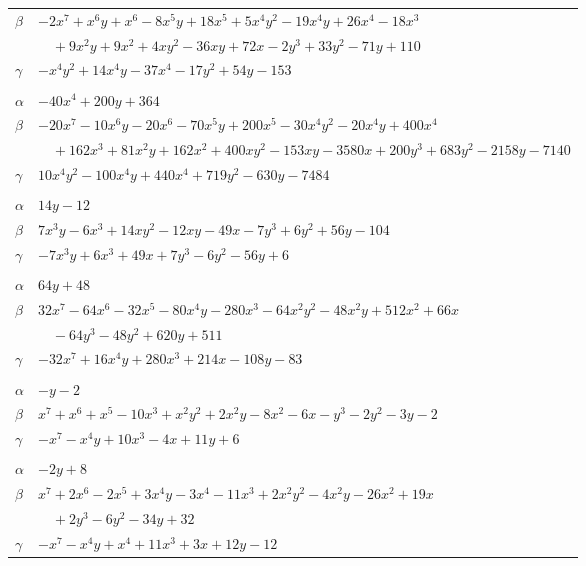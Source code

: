 \documentclass[11pt]{article}
\begin{document}
\begin{longtable}{@{}ll@{}}
$\beta$ & $-2x^{7}+x^{6}y+x^{6}-8x^{5}y+18x^{5}+5x^{4}y^{2}-19x^{4}y+26x^{4}-18x^{3}$\\
 & $\quad +9x^{2}y+9x^{2}+4xy^{2}-36xy+72x-2y^{3}+33y^{2}-71y+110$\\
$\gamma$ & $-x^{4}y^{2}+14x^{4}y-37x^{4}-17y^{2}+54y-153$\\
\addlinespace[3pt]
\multicolumn{2}{@{}l}{$\{i,j\}=\{20,34\}$, $k_{ij}=2^{2}\cdot 3^{4}$}\\
$\alpha$ & $-40x^{4}+200y+364$\\
$\beta$ & $-20x^{7}-10x^{6}y-20x^{6}-70x^{5}y+200x^{5}-30x^{4}y^{2}-20x^{4}y+400x^{4}$\\
 & $\quad +162x^{3}+81x^{2}y+162x^{2}+400xy^{2}-153xy-3580x+200y^{3}+683y^{2}-2158y-7140$\\
$\gamma$ & $10x^{4}y^{2}-100x^{4}y+440x^{4}+719y^{2}-630y-7484$\\
\addlinespace[3pt]
\multicolumn{2}{@{}l}{$\{i,j\}=\{21,32\}$, $k_{ij}=2^{2}\cdot 3$}\\
$\alpha$ & $14y-12$\\
$\beta$ & $7x^{3}y-6x^{3}+14xy^{2}-12xy-49x-7y^{3}+6y^{2}+56y-104$\\
$\gamma$ & $-7x^{3}y+6x^{3}+49x+7y^{3}-6y^{2}-56y+6$\\
\addlinespace[3pt]
\multicolumn{2}{@{}l}{$\{i,j\}=\{21,33\}$, $k_{ij}=5\cdot 7$}\\
$\alpha$ & $64y+48$\\
$\beta$ & $32x^{7}-64x^{6}-32x^{5}-80x^{4}y-280x^{3}-64x^{2}y^{2}-48x^{2}y+512x^{2}+66x$\\
 & $\quad -64y^{3}-48y^{2}+620y+511$\\
$\gamma$ & $-32x^{7}+16x^{4}y+280x^{3}+214x-108y-83$\\
\addlinespace[3pt]
\multicolumn{2}{@{}l}{$\{i,j\}=\{22,31\}$, $k_{ij}=2^{3}$}\\
$\alpha$ & $-y-2$\\
$\beta$ & $x^{7}+x^{6}+x^{5}-10x^{3}+x^{2}y^{2}+2x^{2}y-8x^{2}-6x-y^{3}-2y^{2}-3y-2$\\
$\gamma$ & $-x^{7}-x^{4}y+10x^{3}-4x+11y+6$\\
\addlinespace[3pt]
\multicolumn{2}{@{}l}{$\{i,j\}=\{23,35\}$, $k_{ij}=2^{2}\cdot 3^{2}$}\\
$\alpha$ & $-2y+8$\\
$\beta$ & $x^{7}+2x^{6}-2x^{5}+3x^{4}y-3x^{4}-11x^{3}+2x^{2}y^{2}-4x^{2}y-26x^{2}+19x$\\
 & $\quad +2y^{3}-6y^{2}-34y+32$\\
$\gamma$ & $-x^{7}-x^{4}y+x^{4}+11x^{3}+3x+12y-12$\\

\end{longtable}
\end{document}
